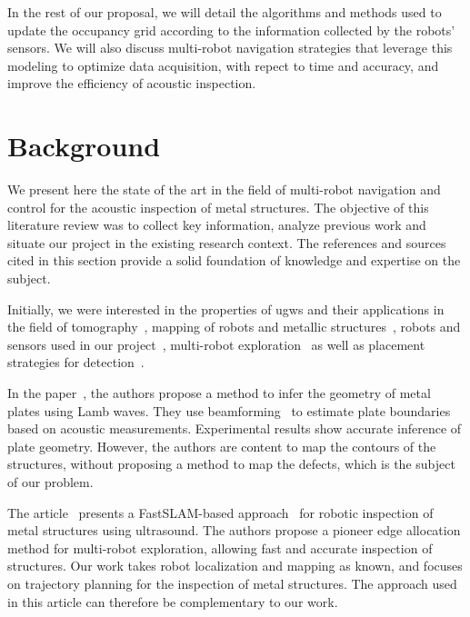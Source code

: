 In the rest of our proposal, we will detail the algorithms and methods used to update the occupancy grid according to the information collected by the robots' sensors.
We will also discuss multi-robot navigation strategies that leverage this modeling to optimize data acquisition, with repect to time and accuracy, and improve the efficiency of acoustic inspection.

\section{Background}\label{sec:background}

We present here the state of the art in the field of multi-robot navigation and control for the acoustic inspection of metal structures.
The objective of this literature review was to collect key information, analyze previous work and situate our project in the existing research context.
The references and sources cited in this section provide a solid foundation of knowledge and expertise on the subject.

Initially, we were interested in the properties of \gls{ugw}s and their applications in the field of tomography~\cite{OUABI2022106705, HUTHWAITE2013979}, mapping of robots and metallic structures~\cite{9364359, 9811581, inventions3030059, 9568841}, robots and sensors used in our project~\cite{s22093235}, multi-robot exploration~\cite{bautin:hal-00757960, articlesvsdf} as well as placement strategies for detection~\cite{article455556, 7487624, 7139673}.

In the paper~\cite{OUABI2022106705}, the authors propose a method to infer the geometry of metal plates using Lamb waves.
They use beamforming~\cite{enwiki:1151960654} to estimate plate boundaries based on acoustic measurements.
Experimental results show accurate inference of plate geometry.
However, the authors are content to map the contours of the structures, without proposing a method to map the defects, which is the subject of our problem.

The article~\cite{9364359} presents a FastSLAM-based approach~\cite{article254524} for robotic inspection of metal structures using ultrasound.
The authors propose a pioneer edge allocation method for multi-robot exploration, allowing fast and accurate inspection of structures.
Our work takes robot localization and mapping as known, and focuses on trajectory planning for the inspection of metal structures.
The approach used in this article can therefore be complementary to our work.

